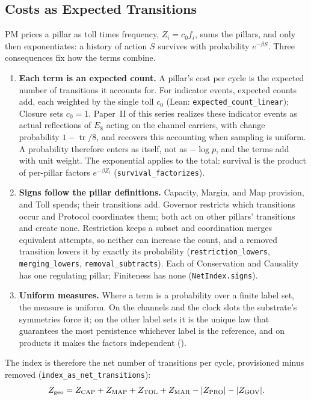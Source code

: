 \subsection{Costs as Expected Transitions}
\label{subsec:additive_theorem}
PM prices a pillar as toll times frequency, $Z_i=c_0f_i$, sums the pillars, and only then exponentiates: a history of action $S$ survives with probability $e^{-\beta S}$\cite{kate_meyer_persistence_2026}. Three consequences fix how the terms combine.
\begin{enumerate}[label=(\roman*)]
\item \textbf{Each term is an expected count.} A pillar's cost per cycle is the expected number of transitions it accounts for. For indicator events, expected counts add, each weighted by the single toll $c_0$ (Lean: \texttt{expected\_count\_linear}); Closure sets $c_0=1$. Paper~II of this series realizes these indicator events as actual reflections of $E_8$ acting on the channel carriers, with change probability $1-\operatorname{tr}/8$, and recovers this accounting when sampling is uniform. A probability therefore enters as itself, not as $-\log p$, and the terms add with unit weight. The exponential applies to the total: survival is the product of per-pillar factors $e^{-\beta Z_i}$ (\texttt{survival\_factorizes}).
\item \textbf{Signs follow the pillar definitions.} Capacity, Margin, and Map provision, and Toll spends; their transitions add. Governor restricts which transitions occur and Protocol coordinates them; both act on other pillars' transitions and create none. Restriction keeps a subset and coordination merges equivalent attempts, so neither can increase the count, and a removed transition lowers it by exactly its probability (\texttt{restriction\_lowers}, \texttt{merging\_lowers}, \texttt{removal\_subtracts}). Each of Conservation and Causality has one regulating pillar; Finiteness has none (\texttt{NetIndex.signs}).
\item \textbf{Uniform measures.} Where a term is a probability over a finite label set, the measure is uniform. On the channels and the clock slots the substrate's symmetries force it; on the other label sets it is the unique law that guarantees the most persistence whichever label is the reference, and on products it makes the factors independent ().
\end{enumerate}
The index is therefore the net number of transitions per cycle, provisioned minus removed (\texttt{index\_as\_net\_transitions}):
\begin{equation}
Z_{\rm geo}=Z_{\rm CAP}+Z_{\rm MAP}+Z_{\rm TOL}+Z_{\rm MAR}-|Z_{\rm PRO}|-|Z_{\rm GOV}|.
\end{equation}

